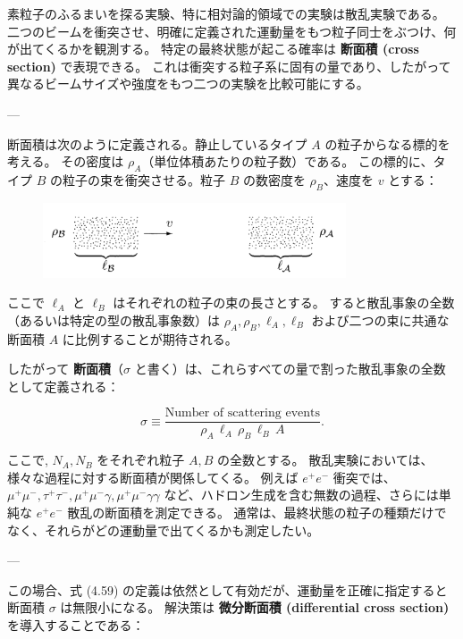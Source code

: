 \documentclass[a4paper,12pt]{article}
\begin{document}
素粒子のふるまいを探る実験、特に相対論的領域での実験は散乱実験である。
二つのビームを衝突させ、明確に定義された運動量をもつ粒子同士をぶつけ、何が出てくるかを観測する。
特定の最終状態が起こる確率は \textbf{断面積 (cross section)} で表現できる。
これは衝突する粒子系に固有の量であり、したがって異なるビームサイズや強度をもつ二つの実験を比較可能にする。

---

断面積は次のように定義される。静止しているタイプ $A$ の粒子からなる標的を考える。
その密度は $\rho_A$（単位体積あたりの粒子数）である。
この標的に、タイプ $B$ の粒子の束を衝突させる。粒子 $B$ の数密度を $\rho_B$、速度を $v$ とする：

\begin{figure}[H]
    \centering\includegraphics[width=0.8\textwidth]{figures/v.png}
\end{figure}


ここで $\ell_A$ と $\ell_B$ はそれぞれの粒子の束の長さとする。
すると散乱事象の全数（あるいは特定の型の散乱事象数）は
$\rho_A, \rho_B, \ell_A, \ell_B$ および二つの束に共通な断面積 $A$ に比例することが期待される。

したがって \textbf{断面積}（$\sigma$ と書く）は、これらすべての量で割った散乱事象の全数として定義される：

\begin{equation}
\sigma \equiv
\frac{\text{Number of scattering events}}
{\rho_A \, \ell_A \, \rho_B \, \ell_B \, A}.
\tag{4.59}
\end{equation}

ここで, $N_A, N_B$ をそれぞれ粒子 $A, B$ の全数とする。  
散乱実験においては、様々な過程に対する断面積が関係してくる。  
例えば $e^+e^-$ 衝突では、$\mu^+\mu^-, \tau^+\tau^-, \mu^+\mu^-\gamma, \mu^+\mu^-\gamma\gamma$ など、ハドロン生成を含む無数の過程、さらには単純な $e^+e^-$ 散乱の断面積を測定できる。  
通常は、最終状態の粒子の種類だけでなく、それらがどの運動量で出てくるかも測定したい。

---

この場合、式 (4.59) の定義は依然として有効だが、運動量を正確に指定すると断面積 $\sigma$ は無限小になる。  
解決策は \textbf{微分断面積 (differential cross section)} を導入することである：
\end{document}
